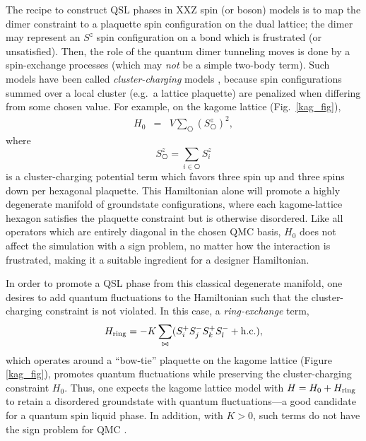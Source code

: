 \documentclass[range]{ar2e}
\begin{document}
The recipe to construct QSL phases in XXZ spin (or boson) models is to map the dimer constraint to a plaquette spin configuration on the dual lattice; the dimer may represent an $S^z$ spin configuration on a bond which is frustrated (or unsatisfied).  Then, the role of the quantum dimer tunneling moves is done by a spin-exchange processes (which may {\it not} be a simple two-body term).  Such models have been called
{\it cluster-charging} models \cite{Isakov2}, because spin configurations summed over a local cluster (e.g.~a lattice plaquette) are penalized when differing from some chosen value.  For example, on the kagome lattice (Fig.~\ref{kag_fig}),
\begin{eqnarray}
H_0 &=& V \sum_{\hexagon} (S^z_{\hexagon})^2,  \label{H0}
\end{eqnarray}
where 
\begin{equation}
S^z_{\hexagon} = \sum_{i \in \hexagon}S^z_i
\end{equation}
is a cluster-charging potential term which favors three spin up and three spins down per hexagonal plaquette.  This Hamiltonian alone will promote a highly degenerate manifold of groundstate configurations, where each kagome-lattice hexagon satisfies the plaquette constraint but is otherwise disordered.  
Like all operators which are entirely diagonal in the chosen QMC basis, $H_0$ does not affect the simulation with a sign problem, no matter how the interaction is frustrated, making it a suitable ingredient for a designer Hamiltonian.

In order to promote a QSL phase from this classical degenerate manifold, one desires to add quantum fluctuations to the Hamiltonian such that the cluster-charging constraint is not violated.  In this case, a {\it ring-exchange} term, 
\begin{eqnarray}
H_{\rm ring} = -K \sum_{\bowtie} ( S_i^{+} S_j^{-} S_k^{+} S_l^{-} + {\rm h.c.} ),
\end{eqnarray} 
which operates around a ``bow-tie'' plaquette on the kagome lattice (Figure \ref{kag_fig}),
promotes quantum fluctuations while preserving the cluster-charging constraint $H_0$.  Thus, one expects the kagome lattice model with $H = H_0 + H_{\rm ring}$ to retain a disordered groundstate with quantum fluctuations---a good candidate for a quantum spin liquid phase.  In addition, with $K>0$, such terms do not have the sign problem for QMC \cite{JKqmc}.
\end{document}

